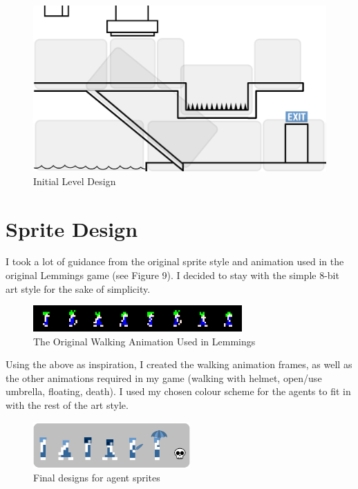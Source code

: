 \documentclass[a4paper,oneside]{report}
\begin{document}
\begin{figure}[h!]
  \centering
    \includegraphics[width=120mm]{sources/images/LevelDesign}
    \caption{Initial Level Design}
\end{figure}
	
\section{Sprite Design}
		
I took a lot of guidance from the original sprite style and animation used in the original Lemmings game (see Figure 9). I decided to stay with the simple 8-bit art style for the sake of simplicity.
	
\begin{figure}[h!]
  \centering
    \includegraphics[width=80mm]{sources/images/lemmings-walker-sprites}
    \caption{The Original Walking Animation Used in Lemmings}
\end{figure}
		
Using the above as inspiration, I created the walking animation frames, as well as the other animations required in my game (walking with helmet, open/use umbrella, floating, death). I used my chosen colour scheme for the agents to fit in with the rest of the art style.
		
\begin{figure}[h!]
  \centering
    \includegraphics[width=60mm]{sources/images/Final}
    \caption{Final designs for agent sprites}
\end{figure}
\end{document}
